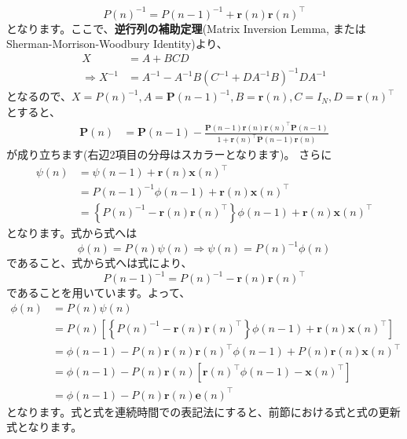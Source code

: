 \begin{equation}
P(n)^{-1}=P(n-1)^{-1}+\boldsymbol{r}(n) \boldsymbol{r}(n)^\intercal
\end{equation}
となります。ここで、\textbf{逆行列の補助定理}(Matrix Inversion Lemma, またはSherman-Morrison-Woodbury Identity)より、
\begin{align}
X&=A+BCD\\
\Rightarrow X^{-1}&=A^{-1} - A^{-1}B(C^{-1}+DA^{-1}B)^{-1}DA^{-1}
\end{align}
となるので、$X={P}(n)^{-1}, A=\boldsymbol{P}(n-1)^{-1}, B= \boldsymbol{r}(n), C=I_{N}, D=\boldsymbol{r}(n)^\intercal$とすると、
\begin{align}
\boldsymbol{P}(n)&=\boldsymbol{P}(n-1)-\frac{\boldsymbol{P}(n-1) \boldsymbol{r}(n) \boldsymbol{r}(n)^\intercal \boldsymbol{P}(n-1)}{1+\boldsymbol{r}(n)^\intercal \boldsymbol{P}(n-1) \boldsymbol{r}(n)} 
\end{align}
が成り立ちます(右辺2項目の分母はスカラーとなります)。
さらに
\begin{align}
\psi(n)&=\psi(n-1)+\boldsymbol{r}(n)\boldsymbol{x}(n)^\intercal\\
&=P(n-1)^{-1}\phi(n-1)+\boldsymbol{r}(n)\boldsymbol{x}(n)^\intercal\\
&=\left\{P(n)^{-1}-\boldsymbol{r}(n) \boldsymbol{r}(n)^\intercal\right\}\phi(n-1)+\boldsymbol{r}(n)\boldsymbol{x}(n)^\intercal
\end{align}
となります。式から式へは
\begin{equation}
\phi(n)=P(n)\psi(n) \Rightarrow \psi(n)=P(n)^{-1}\phi(n)
\end{equation}
であること、式から式へは式により、
\begin{equation}
P(n-1)^{-1}=P(n)^{-1}-\boldsymbol{r}(n) \boldsymbol{r}(n)^\intercal
\end{equation}
であることを用いています。よって、
\begin{align}
\phi(n)&=P(n)\psi(n)\\
&=P(n)\left[\left\{P(n)^{-1}-\boldsymbol{r}(n) \boldsymbol{r}(n)^\intercal\right\}\phi(n-1)+\boldsymbol{r}(n)\boldsymbol{x}(n)^\intercal\right]\\
&=\phi(n-1)-P(n)\boldsymbol{r}(n)\boldsymbol{r}(n)^\intercal\phi(n-1)+P(n)\boldsymbol{r}(n)\boldsymbol{x}(n)^\intercal\\
&=\phi(n-1)-P(n)\boldsymbol{r}(n)\left[\boldsymbol{r}(n)^\intercal\phi(n-1)-\boldsymbol{x}(n)^\intercal\right]\\
&=\phi(n-1)-P(n)\boldsymbol{r}(n)\boldsymbol{e}(n)^\intercal
\end{align}
となります。式と式を連続時間での表記法にすると、前節における式と式の更新式となります。
